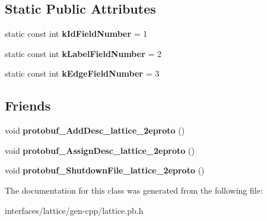 \subsection*{Static Public Attributes}
\begin{DoxyCompactItemize}
\item 
\hypertarget{classlattice_1_1Lattice__Node_a5f2df3e8557da8697c9bedaf6d7e9e32}{
static const int {\bfseries kIdFieldNumber} = 1}
\label{classlattice_1_1Lattice__Node_a5f2df3e8557da8697c9bedaf6d7e9e32}

\item 
\hypertarget{classlattice_1_1Lattice__Node_ac19a4aa98d9ef4fee4032e4e493d53d1}{
static const int {\bfseries kLabelFieldNumber} = 2}
\label{classlattice_1_1Lattice__Node_ac19a4aa98d9ef4fee4032e4e493d53d1}

\item 
\hypertarget{classlattice_1_1Lattice__Node_a76b647ba9708e295b6b4223635dca164}{
static const int {\bfseries kEdgeFieldNumber} = 3}
\label{classlattice_1_1Lattice__Node_a76b647ba9708e295b6b4223635dca164}

\end{DoxyCompactItemize}
\subsection*{Friends}
\begin{DoxyCompactItemize}
\item 
\hypertarget{classlattice_1_1Lattice__Node_a19e63fb37025879e023cad88064187cf}{
void {\bfseries protobuf\_\-AddDesc\_\-lattice\_\-2eproto} ()}
\label{classlattice_1_1Lattice__Node_a19e63fb37025879e023cad88064187cf}

\item 
\hypertarget{classlattice_1_1Lattice__Node_a3b0386e09a9fefcf1bdce658cfc480b2}{
void {\bfseries protobuf\_\-AssignDesc\_\-lattice\_\-2eproto} ()}
\label{classlattice_1_1Lattice__Node_a3b0386e09a9fefcf1bdce658cfc480b2}

\item 
\hypertarget{classlattice_1_1Lattice__Node_a3c7b187721d0704ceb19ff889729d35a}{
void {\bfseries protobuf\_\-ShutdownFile\_\-lattice\_\-2eproto} ()}
\label{classlattice_1_1Lattice__Node_a3c7b187721d0704ceb19ff889729d35a}

\end{DoxyCompactItemize}


The documentation for this class was generated from the following file:\begin{DoxyCompactItemize}
\item 
interfaces/lattice/gen-\/cpp/lattice.pb.h\end{DoxyCompactItemize}

